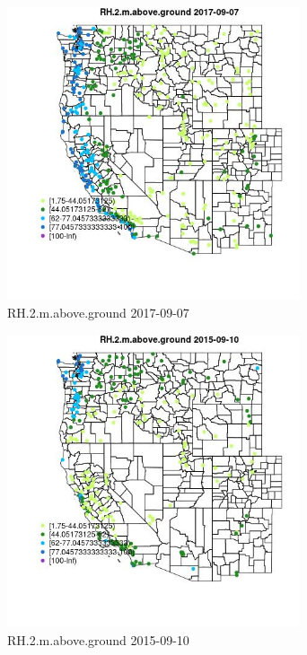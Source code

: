 \begin{figure} 
\centering  
\includegraphics[width=0.77\textwidth]{Code_Outputs/Report_ML_input_PM25_Step4_part_e_de_duplicated_aves_compiled_2019-05-21wNAs_MapObsRH2maboveground2017-09-07.jpg} 
\caption{\label{fig:Report_ML_input_PM25_Step4_part_e_de_duplicated_aves_compiled_2019-05-21wNAsMapObsRH2maboveground2017-09-07}RH.2.m.above.ground 2017-09-07} 
\end{figure} 
 

\begin{figure} 
\centering  
\includegraphics[width=0.77\textwidth]{Code_Outputs/Report_ML_input_PM25_Step4_part_e_de_duplicated_aves_compiled_2019-05-21wNAs_MapObsRH2maboveground2015-09-10.jpg} 
\caption{\label{fig:Report_ML_input_PM25_Step4_part_e_de_duplicated_aves_compiled_2019-05-21wNAsMapObsRH2maboveground2015-09-10}RH.2.m.above.ground 2015-09-10} 
\end{figure} 
 

